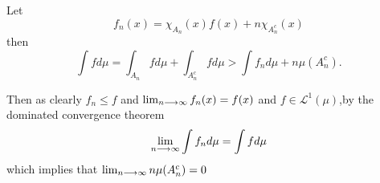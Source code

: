 \documentclass{unswmaths}
\begin{document}
\section{}

Let 
$$
    f_n(x) = \chi_{A_n}(x) f(x) + n \chi_{A_n^c}(x)
$$
then
$$
    \int f d \mu = \int_{A_n} f d\mu + \int_{A_n^c} f d\mu > \int f_n d\mu + n \mu(A_n^c).
$$

Then as clearly $ f_n \leq f $ and $ \lim_{n \longrightarrow \infty} f_{n}(x) = f(x) $ and $ f \in \mathcal{L}^1(\mu) $,by the dominated convergence theorem 
$$
    \lim_{n \longrightarrow \infty} \int f_n d \mu = \int f d \mu
$$
which implies that $ \lim_{n\longrightarrow \infty} n \mu( A_n^c) = 0 $
\end{document}
